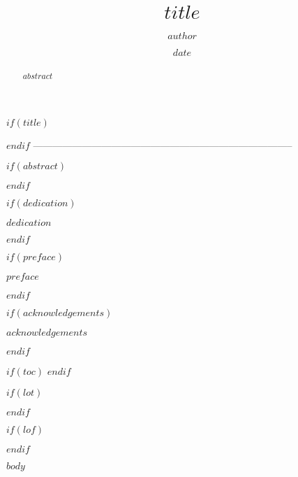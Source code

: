 \documentclass[12pt, oneside]{UOAthesis} %
\title{$title$}             %
\author{$author$}           %
\date{$date$}               %
\begin{document}

$if(title)$
  \maketitle
$endif$
--------------------------------------------------------------------------------

\frontmatter %

$if(abstract)$
  \begin{abstract}
    $abstract$
  \end{abstract}
$endif$

$if(dedication)$
  \begin{dedication}
    $dedication$
  \end{dedication}
$endif$

$if(preface)$
  \begin{preface}
    $preface$
  \end{preface}
$endif$

$if(acknowledgements)$
  \begin{acknowledgements}
    $acknowledgements$
  \end{acknowledgements}
$endif$

$if(toc)$
  \hypersetup{linkcolor=$if(toccolor)$$toccolor$$else$black$endif$}
  \setcounter{secnumdepth}{$toc-depth$}
  \setcounter{tocdepth}{$toc-depth$}
  \tableofcontents
$endif$

$if(lot)$
  \listoftables
$endif$

$if(lof)$
  \listoffigures
$endif$


\mainmatter %
\pagestyle{fancyplain} %

$body$


\end{document}

